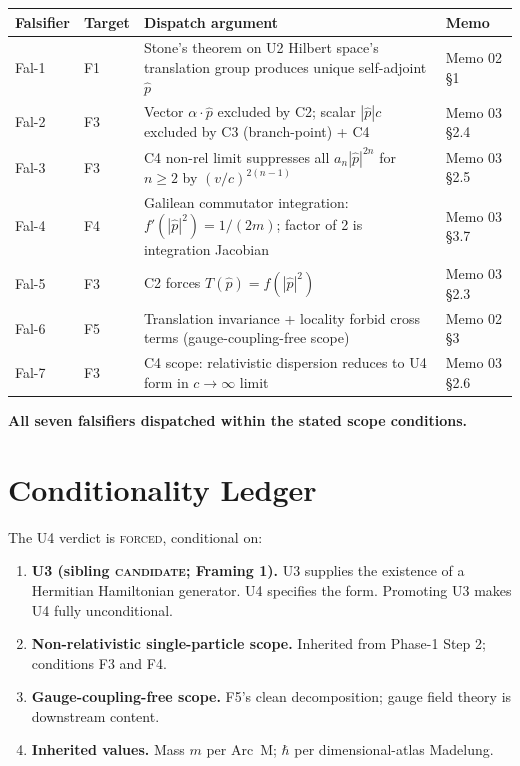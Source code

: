 \documentclass[11pt,a4paper]{article}
\begin{document}
\begin{center}
\begin{tabular}{p{1.5cm}p{1.0cm}p{8.5cm}p{2.5cm}}
\hline
Falsifier & Target & Dispatch argument & Memo \\
\hline
Fal-1 & F1 & Stone's theorem on U2 Hilbert space's translation group produces unique self-adjoint $\hat{p}$ & Memo 02 \S 1 \\
Fal-2 & F3 & Vector $\alpha \cdot \hat{p}$ excluded by C2; scalar $|\hat{p}| c$ excluded by C3 (branch-point) + C4 & Memo 03 \S 2.4 \\
Fal-3 & F3 & C4 non-rel limit suppresses all $a_n |\hat{p}|^{2n}$ for $n \geq 2$ by $(v/c)^{2(n-1)}$ & Memo 03 \S 2.5 \\
Fal-4 & F4 & Galilean commutator integration: $f'(|\hat{p}|^2) = 1/(2m)$; factor of 2 is integration Jacobian & Memo 03 \S 3.7 \\
Fal-5 & F3 & C2 forces $T(\hat{p}) = f(|\hat{p}|^2)$ & Memo 03 \S 2.3 \\
Fal-6 & F5 & Translation invariance + locality forbid cross terms (gauge-coupling-free scope) & Memo 02 \S 3 \\
Fal-7 & F3 & C4 scope: relativistic dispersion reduces to U4 form in $c \to \infty$ limit & Memo 03 \S 2.6 \\
\hline
\end{tabular}
\end{center}

\textbf{All seven falsifiers dispatched within the stated scope conditions.}

\section{Conditionality Ledger}\label{sec:conditionality}

The U4 verdict is \textsc{forced}, conditional on:

\begin{enumerate}
  \item \textbf{U3 (sibling \textsc{candidate}; Framing 1).} U3 supplies the existence of a Hermitian Hamiltonian generator. U4 specifies the form. Promoting U3 makes U4 fully unconditional.
  \item \textbf{Non-relativistic single-particle scope.} Inherited from Phase-1 Step 2; conditions F3 and F4.
  \item \textbf{Gauge-coupling-free scope.} F5's clean decomposition; gauge field theory is downstream content.
  \item \textbf{Inherited values.} Mass $m$ per Arc~M; $\hbar$ per dimensional-atlas Madelung.
\end{enumerate}
\end{document}
